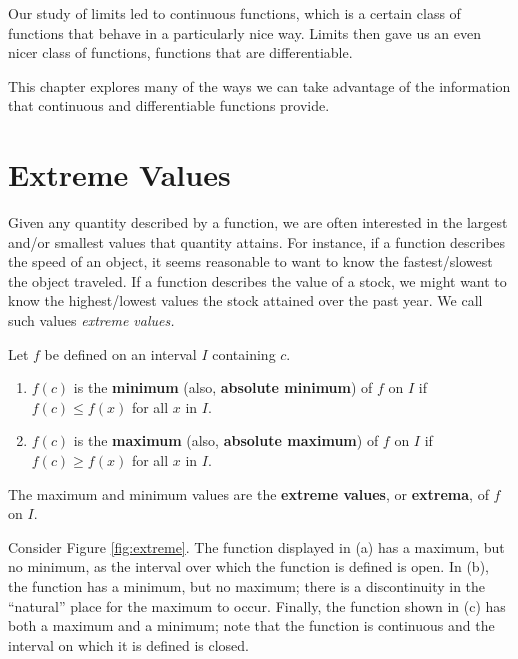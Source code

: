Our study of limits led to continuous functions, which is a certain class of functions that behave in a particularly nice way. Limits then gave us an even nicer class of functions, functions that are differentiable.

This chapter explores many of the ways we can take advantage of the information that continuous and differentiable functions  provide.

\section{Extreme Values}\label{sec:extreme_values}

\enlargethispage{2\baselineskip}
Given any quantity described by a function, we are often interested in the largest and/or smallest values that quantity attains. For instance, if a function describes the speed of an object, it seems reasonable to want to know the fastest/slowest the object traveled. If a function describes the value of a stock, we might want to know  the highest/lowest values the stock attained over the past year. We call such values \textit{extreme values.}

%
{Let $f$ be defined on an interval $I$ containing $c$.
	\begin{enumerate}
	\item		$f(c)$ is the \textbf{minimum} (also, \textbf{absolute minimum}) of $f$ on $I$ if $f(c) \leq f(x)$ for all $x$ in $I$.
	\item		$f(c)$ is the \textbf{maximum} (also, \textbf{absolute maximum}) of $f$ on $I$ if $f(c) \geq f(x)$ for all $x$ in $I$.
	\end{enumerate}
	The maximum and minimum values are the \textbf{extreme values}, or \textbf{extrema}, of $f$ on $I$.
	}

	

Consider Figure \ref{fig:extreme}. %
 The function displayed in (a) has a maximum, but no minimum, as the interval over which the function is defined is open. In (b), the function has a minimum, but no maximum; there is a discontinuity in the ``natural'' place for the maximum to occur. Finally, the function shown in (c) has both a maximum and a minimum; note that the function is continuous and the interval on which it is defined is closed. 
 
